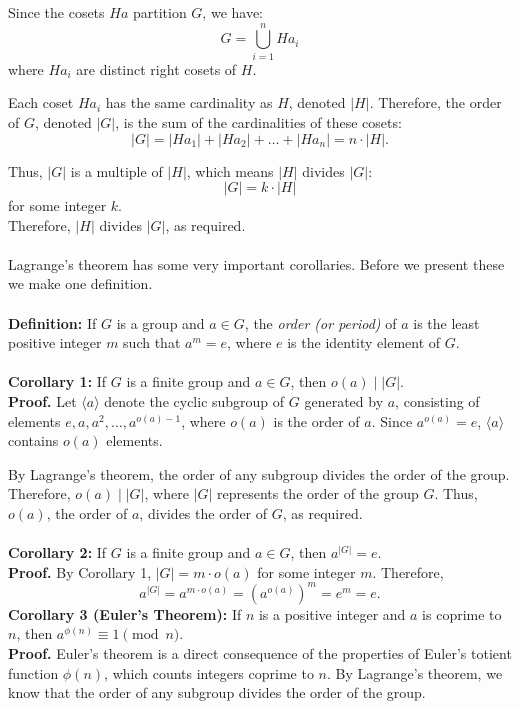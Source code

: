 Since the cosets \( Ha \) partition \( G \), we have:
\[ G = \bigcup_{i=1}^{n} Ha_i \]
where \( Ha_i \) are distinct right cosets of \( H \).

Each coset \( Ha_i \) has the same cardinality as \( H \), denoted \( |H| \). Therefore, the order of \( G \), denoted \( |G| \), is the sum of the cardinalities of these cosets:
\[ |G| = |Ha_1| + |Ha_2| + \ldots + |Ha_n| = n \cdot |H|. \]

Thus, \( |G| \) is a multiple of \( |H| \), which means \( |H| \) divides \( |G| \):
\[ |G| = k \cdot |H| \] for some integer \( k \).\\
Therefore, \( |H| \) divides \( |G| \), as required.\\\\
Lagrange's theorem has some very important corollaries. Before we present these we make one definition.\\\\
\textbf{Definition:} If \( G \) is a group and \( a \in G \), the \textit{order (or period)} of \( a \) is the least positive integer \( m \) such that \( a^m = e \), where \( e \) is the identity element of \( G \).\\\\
\textbf{Corollary 1:} If \( G \) is a finite group and \( a \in G \), then \( o(a) \mid |G| \).\\
\textbf{Proof.} Let \( \langle a \rangle \) denote the cyclic subgroup of \( G \) generated by \( a \), consisting of elements \( e, a, a^2, \ldots, a^{o(a)-1} \), where \( o(a) \) is the order of \( a \). Since \( a^{o(a)} = e \), \( \langle a \rangle \) contains \( o(a) \) elements.

By Lagrange's theorem, the order of any subgroup divides the order of the group. Therefore, \( o(a) \mid |G| \), where \( |G| \) represents the order of the group \( G \). Thus, \( o(a) \), the order of \( a \), divides the order of \( G \), as required.
\\
\\
\textbf{Corollary 2:} If \( G \) is a finite group and \( a \in G \), then \( a^{|G|} = e \).
\\
\textbf{Proof.} By Corollary 1, \( |G| = m \cdot o(a) \) for some integer \( m \).
Therefore,
\[ a^{|G|} = a^{m \cdot o(a)} = (a^{o(a)})^m = e^m = e. \]
\textbf{Corollary 3 (Euler's Theorem):} If \( n \) is a positive integer and \( a \) is coprime to \( n \), then \( a^{\phi(n)} \equiv 1 \pmod{n} \).
\\
\textbf{Proof.} Euler's theorem is a direct consequence of the properties of Euler's totient function \( \phi(n) \), which counts integers coprime to \( n \). By Lagrange's theorem, we know that the order of any subgroup divides the order of the group. 

